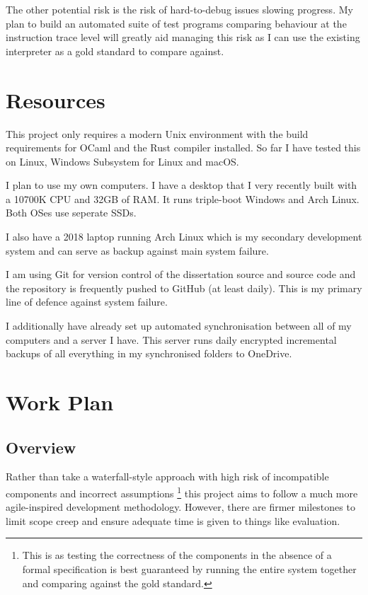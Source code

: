 \documentclass[12pt,a4paper, headings=standardclasses]{scrartcl}
\begin{document}
The other potential risk is the risk of hard-to-debug issues slowing
progress. My plan to build an automated suite of test programs comparing
behaviour at the instruction trace level will greatly aid managing this risk
as I can use the existing interpreter as a gold standard to compare against.

\section*{Resources}

This project only requires a modern Unix environment with the build
requirements for OCaml and the Rust compiler installed. So far I have tested
this on Linux, Windows Subsystem for Linux and macOS.

I plan to use my own computers. I have a desktop that I very recently built
with a 10700K CPU and 32GB of RAM. It runs triple-boot Windows and Arch
Linux. Both OSes use seperate SSDs.

I also have a 2018 laptop running Arch Linux which is my secondary
development system and can serve as backup against main system failure.

I am using Git for version control of the dissertation source and source code
and the repository is frequently pushed to GitHub (at least daily). This is
my primary line of defence against system failure.

I additionally have already set up automated synchronisation between all of
my computers and a server I have. This server runs daily encrypted
incremental backups of all everything in my synchronised folders to OneDrive.

\section*{Work Plan}

\subsection*{Overview}

Rather than take a waterfall-style approach with high risk of incompatible
components and incorrect assumptions
\footnote{This is as testing the correctness of the components in the absence
      of a formal specification is best guaranteed by running the entire system
      together and comparing against the gold standard.}
this project aims to follow a much more
agile-inspired development methodology. However, there are firmer milestones
to limit scope creep and ensure adequate time is given to things like
evaluation.
\end{document}
